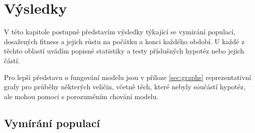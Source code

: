 \chapter{Výsledky}

%
%
%
%
%
%
%

V této kapitole postupně představím výsledky týkající se vymirání populací, dosažených fitness a jejich růstu
na počátku a konci každého období. U každé z těchto oblastí uvádím popisné statistiky a testy příslušných
hypotéz nebo jejich částí.

Pro lepší představu o fungování modelu jsou v příloze \ref{sec:graphs} reprezentativní grafy pro průběhy některých
veličin, včetně těch, které nebyly součástí hypotéz, ale mohou pomoci s porozuměním chování modelu.

\section{Vymírání populací}

